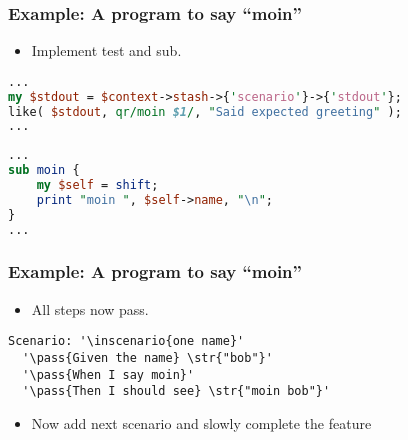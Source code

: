 \documentclass[10pt]{vcs_beamer}
\newcommand{\inscenario}[1]{\color{RoyalBlue}{#1}}
\newcommand{\str}[1]{\color{Turquoise}{#1}}
\newcommand{\pass}[1]{\color{ForestGreen}{#1}}
\newcommand{\Then}{\color{ForestGreen}{Then}}
\begin{document}
\begin{frame}[fragile]
\frametitle{Example: A program to say ``moin''}

\begin{itemize}
    \item Implement \ttt{\Then} test and  sub.
\end{itemize}

\begin{lstlisting}[language=perl]
...
my $stdout = $context->stash->{'scenario'}->{'stdout'};
like( $stdout, qr/moin $1/, "Said expected greeting" );
...
\end{lstlisting}

\begin{lstlisting}[language=perl]
...
sub moin {
    my $self = shift;
    print "moin ", $self->name, "\n";
}
...
\end{lstlisting}

\end{frame}

\begin{frame}[fragile]
\frametitle{Example: A program to say ``moin''}

\begin{itemize}
    \item All steps now pass.
\end{itemize}

\begin{lstlisting}[escapeinside='']
Scenario: '\inscenario{one name}'
  '\pass{Given the name} \str{"bob"}'
  '\pass{When I say moin}'
  '\pass{Then I should see} \str{"moin bob"}'
\end{lstlisting}

\begin{itemize}
    \item Now add next scenario and slowly complete the feature
\end{itemize}

\end{frame}
\end{document}
